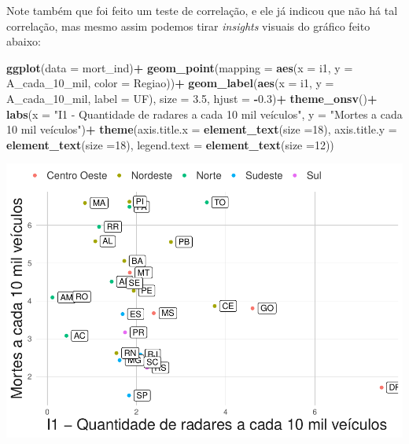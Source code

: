 \documentclass[
]{book}
\newenvironment{Shaded}{\begin{snugshade}}{\end{snugshade}}
\newcommand{\AttributeTok}[1]{\textcolor[rgb]{0.13,0.29,0.53}{#1}}
\newcommand{\DecValTok}[1]{\textcolor[rgb]{0.00,0.00,0.81}{#1}}
\newcommand{\FloatTok}[1]{\textcolor[rgb]{0.00,0.00,0.81}{#1}}
\newcommand{\FunctionTok}[1]{\textcolor[rgb]{0.13,0.29,0.53}{\textbf{#1}}}
\newcommand{\NormalTok}[1]{#1}
\newcommand{\SpecialCharTok}[1]{\textcolor[rgb]{0.81,0.36,0.00}{\textbf{#1}}}
\newcommand{\StringTok}[1]{\textcolor[rgb]{0.31,0.60,0.02}{#1}}
\begin{document}
Note também que foi feito um teste de correlação, e ele já indicou que não há tal correlação, mas mesmo assim podemos tirar \emph{insights} visuais do gráfico feito abaixo:

\begin{Shaded}
\begin{Highlighting}[]
\FunctionTok{ggplot}\NormalTok{(}\AttributeTok{data =}\NormalTok{ mort\_ind)}\SpecialCharTok{+}
  \FunctionTok{geom\_point}\NormalTok{(}\AttributeTok{mapping =} \FunctionTok{aes}\NormalTok{(}\AttributeTok{x =}\NormalTok{ i1, }\AttributeTok{y =}\NormalTok{ A\_cada\_10\_mil, }\AttributeTok{color =}\NormalTok{ Regiao))}\SpecialCharTok{+}
  \FunctionTok{geom\_label}\NormalTok{(}\FunctionTok{aes}\NormalTok{(}\AttributeTok{x =}\NormalTok{ i1, }\AttributeTok{y =}\NormalTok{ A\_cada\_10\_mil, }\AttributeTok{label =}\NormalTok{ UF), }\AttributeTok{size =} \FloatTok{3.5}\NormalTok{, }\AttributeTok{hjust =} \SpecialCharTok{{-}}\FloatTok{0.3}\NormalTok{)}\SpecialCharTok{+}
  \FunctionTok{theme\_onsv}\NormalTok{()}\SpecialCharTok{+}
  \FunctionTok{labs}\NormalTok{(}\AttributeTok{x =} \StringTok{"I1 {-} Quantidade de radares a cada 10 mil veículos"}\NormalTok{, }\AttributeTok{y =} \StringTok{"Mortes a cada 10 mil veículos"}\NormalTok{)}\SpecialCharTok{+}
  \FunctionTok{theme}\NormalTok{(}\AttributeTok{axis.title.x =} \FunctionTok{element\_text}\NormalTok{(}\AttributeTok{size =}\DecValTok{18}\NormalTok{),}
        \AttributeTok{axis.title.y =} \FunctionTok{element\_text}\NormalTok{(}\AttributeTok{size =}\DecValTok{18}\NormalTok{), }
        \AttributeTok{legend.text =} \FunctionTok{element\_text}\NormalTok{(}\AttributeTok{size =}\DecValTok{12}\NormalTok{))}
\end{Highlighting}
\end{Shaded}

\includegraphics{RelatorioVelocidades_files/figure-latex/unnamed-chunk-28-1.pdf}

  
\end{document}
